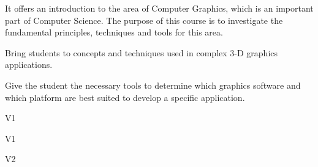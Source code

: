 \begin{syllabus}


\begin{justification}
It offers an introduction to the area of Computer Graphics, which is an important part of Computer Science.
The purpose of this course is to investigate the fundamental principles, techniques and tools for this area.
\end{justification}

\begin{goals}
\item Bring students to concepts and techniques used in complex 3-D graphics applications.
\item Give the student the necessary tools to determine which graphics software and which platform are best suited to develop a specific application.
\end{goals}

\begin{outcomes}{V1}
    \item {}
    \item {}
    \item {}
    \item {}
    \item {}
\end{outcomes}

\begin{specificoutcomes}{V1}
    \item {}
    \item {}
    \item {}
    \item {}
    \item {}
    \item {}
    \item {}
    \item {}
    \item {}
\end{specificoutcomes}

\begin{outcomes}{V2}
    \item {}
    \item {}
    \item {}
\end{outcomes}


\end{syllabus}
